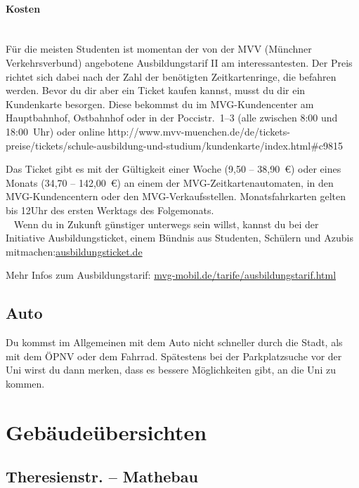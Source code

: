 \documentclass[twoside,12pt,parskip=half-]{scrartcl}
\begin{document}
\paragraph{Kosten}\hfill\\
Für die meisten Studenten ist momentan der von der MVV (Münchner Verkehrsverbund) angebotene Ausbildungstarif II am interessantesten. Der Preis richtet sich dabei nach der Zahl der benötigten Zeitkartenringe, die befahren werden. Bevor du dir aber ein Ticket kaufen kannst, musst du dir ein Kundenkarte besorgen. Diese bekommst du im MVG-Kundencenter am Hauptbahnhof, Ostbahnhof oder in der Poccistr.~1--3 (alle zwischen 8:00 und 18:00~Uhr) oder online \newline http://www.mvv-muenchen.de/de/tickets-preise/tickets/schule-ausbildung-und-studium/\newline kundenkarte/index.html\#c9815

Das Ticket gibt es mit der Gültigkeit einer Woche (9,50 -- 38,90~€) oder eines Monats (34,70 -- 142,00~€) an einem der MVG-Zeitkartenautomaten, in den MVG-Kundencentern oder den MVG-Verkaufsstellen. Monatsfahrkarten gelten bis 12Uhr des ersten Werktags des Folgemonats.\\
~
Wenn du in Zukunft günstiger unterwegs sein willst, kannst du bei der Initiative Ausbildungsticket, einem Bündnis aus Studenten, Schülern und Azubis mitmachen:\newline \url{ausbildungsticket.de}

Mehr Infos zum Ausbildungstarif: \url{mvg-mobil.de/tarife/ausbildungstarif.html}


\subsection{Auto}
Du kommst im Allgemeinen mit dem Auto nicht schneller durch die Stadt, als mit dem ÖPNV oder dem Fahrrad. Spätestens bei der Parkplatzsuche vor der Uni wirst du dann merken, dass es bessere Möglichkeiten gibt, an die Uni zu kommen.

\pagebreak

\section{Gebäudeübersichten}

\subsection{Theresienstr. -- Mathebau}
\end{document}
